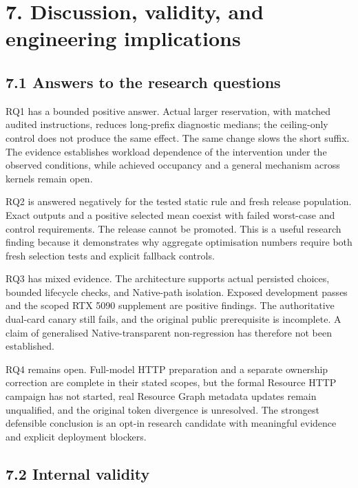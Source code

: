 \documentclass[11pt,a4paper]{article}
\begin{document}
\clearpage

\section*{7. Discussion, validity, and engineering implications}


\subsection*{7.1 Answers to the research questions}

RQ1 has a bounded positive answer. Actual larger reservation, with matched audited instructions, reduces long-prefix diagnostic medians; the ceiling-only control does not produce the same effect. The same change slows the short suffix. The evidence establishes workload dependence of the intervention under the observed conditions, while achieved occupancy and a general mechanism across kernels remain open.


RQ2 is answered negatively for the tested static rule and fresh release population. Exact outputs and a positive selected mean coexist with failed worst-case and control requirements. The release cannot be promoted. This is a useful research finding because it demonstrates why aggregate optimisation numbers require both fresh selection tests and explicit fallback controls.


RQ3 has mixed evidence. The architecture supports actual persisted choices, bounded lifecycle checks, and Native-path isolation. Exposed development passes and the scoped RTX 5090 supplement are positive findings. The authoritative dual-card canary still fails, and the original public prerequisite is incomplete. A claim of generalised Native-transparent non-regression has therefore not been established.


RQ4 remains open. Full-model HTTP preparation and a separate ownership correction are complete in their stated scopes, but the formal Resource HTTP campaign has not started, real Resource Graph metadata updates remain unqualified, and the original token divergence is unresolved. The strongest defensible conclusion is an opt-in research candidate with meaningful evidence and explicit deployment blockers.


\subsection*{7.2 Internal validity}
\end{document}
